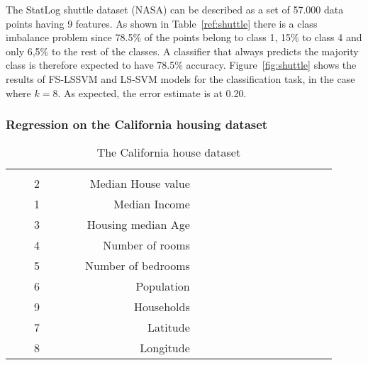 \documentclass[conference,compsoc]{IEEEtran}
\begin{document}
The StatLog shuttle dataset (NASA) can be described as a set of 57.000 data points having 9 features. As shown in Table~\ref{ref:shuttle} there is a class imbalance problem since 78.5\% of the points belong to class 1, 15\% to class 4 and only 6,5\% to the rest of the classes. A classifier that always predicts the majority class is therefore expected to have 78.5\% accuracy. Figure~\ref{fig:shuttle} shows the results of FS-LSSVM and LS-SVM models for the classification task, in the case where $k=8$. As expected, the error estimate is at 0.20.





%
%
%




\subsubsection{Regression on the California housing dataset}
\begin{table}\centering
\begin{tabular}{@{}rrrrrrrrrrccrrrcrrr@{}}\toprule
& \multicolumn{4}{c}{} & \phantom{abc}& \multicolumn{2}{c}{} &

\phantom{abc} \\

&   &     2&   &&  &Median House value &  \\
&   &     1&   &&  &Median Income &  \\
  &   &  3 &   &&  &     Housing median Age &  \\
&   &  4 &   &&  &   Number of rooms &  \\
    &   & 5 &   &&  & Number of bedrooms&  \\
    &   & 6&   &&  &  Population&  \\
     &   & 9 &   &&  &  Households &  \\
    &   &  7 &   &&  &  Latitude &  \\
 &   & 8 &   &&  &  Longitude &  \\
\bottomrule
\end{tabular}
\caption{The California house dataset}
\label{ref:california}
\end{table} 
\end{document}
